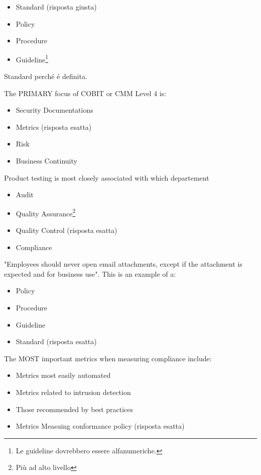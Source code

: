 \begin{itemize}
\item Standard (risposta giusta)
\item Policy
\item Procedure
\item Guideline\footnote{Le guideline dovrebbero essere alfanumeriche.}
\end{itemize}
Standard perché é definita.



The PRIMARY focus of COBIT or CMM Level 4 is:
\begin{itemize}
\item Security Documentations
\item Metrics (risposta esatta)
\item Risk
\item Business Continuity
\end{itemize}


Product testing is most closely associated with which departement
\begin{itemize}
\item Audit
\item Quality Assurance\footnote{Più ad alto livello}
\item Quality Control (risposta esatta)
\item Compliance
\end{itemize}



"Employees should never open email attachments, except if the attachment is 
expected and for business use". This is an example of a:

\begin{itemize}
\item Policy
\item Procedure
\item Guideline
\item Standard (risposta esatta)
\end{itemize}






The MOST important metrics when measuring compliance include:
\begin{itemize}
\item Metrics most easily automated
\item Metrics related to intrusion detection
\item Those recommended by best practices
\item Metrics Measuing conformance policy (risposta esatta)
\end{itemize}

